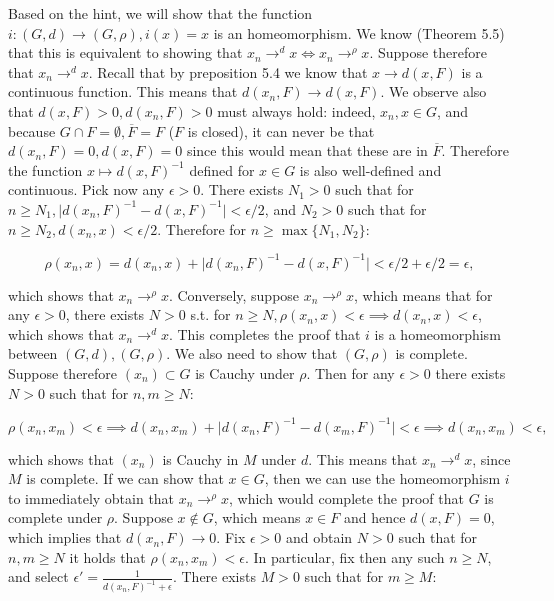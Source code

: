 \begin{solution}
    
    Based on the hint, we will show that the function $i: (G, d) \rightarrow (G, \rho), i(x) = x$ is an homeomorphism.
    We know (Theorem 5.5) that this is equivalent to showing that $x_n \rightarrow^{d} x \iff x_n \rightarrow^{\rho} x$.
    Suppose therefore that $x_n \rightarrow^{d} x$.
    Recall that by preposition 5.4 we know that $x \rightarrow d(x, F)$ is a continuous function.
    This means that $d(x_n, F) \rightarrow d(x, F)$.
    We observe also that $d(x, F) > 0, d(x_n, F) > 0$ must always hold: indeed, $x_n, x \in G$, and because $G \cap F = \emptyset, \overline{F} = F$ ($F$ is closed), it can never be that $d(x_n, F) = 0, d(x, F) = 0$ since this would mean that these are in $\overline{F}$.
    Therefore the function $x \mapsto d(x, F)^{-1}$ defined for $x \in G$ is also well-defined and continuous.
    Pick now any $\epsilon > 0$.
    There exists $N_1 > 0$ such that for $n \geq N_1, \lvert d(x_n, F)^{-1} - d(x, F)^{-1} \rvert < \epsilon/2$, and $N_2 > 0$ such that for $n \geq N_2, d(x_n, x) < \epsilon/2$.
    Therefore for $n \geq \max\{N_1, N_2\}$:

    \[\rho(x_n, x) = d(x_n, x) + \lvert d(x_n, F)^{-1} - d(x, F)^{-1} \rvert < \epsilon/2 + \epsilon/2 = \epsilon,\]

    which shows that $x_n \rightarrow^{\rho} x$.
    Conversely, suppose $x_n \rightarrow^{\rho} x$, which means that for any $\epsilon > 0$, there exists $N > 0$ s.t. for $n \geq N, \rho(x_n, x) < \epsilon \implies d(x_n, x) < \epsilon$, which shows that $x_n \rightarrow^{d} x$.
    This completes the proof that $i$ is a homeomorphism between $(G, d), (G, \rho)$.
    We also need to show that $(G, \rho)$ is complete.
    Suppose therefore $(x_n) \subset G$ is Cauchy under $\rho$.
    Then for any $\epsilon > 0$ there exists $N > 0$ such that for $n, m \geq N$:

    \[\rho(x_n, x_m) < \epsilon \implies d(x_n, x_m) + \lvert d(x_n, F)^{-1} - d(x_m, F)^{-1} \rvert < \epsilon \implies d(x_n, x_m) < \epsilon,\]

    which shows that $(x_n)$ is Cauchy in $M$ under $d$.
    This means that $x_n \rightarrow^{d} x$, since $M$ is complete.
    If we can show that $x \in G$, then we can use the homeomorphism $i$ to immediately obtain that $x_n \rightarrow^{\rho} x$, which would complete the proof that $G$ is complete under $\rho$.
    Suppose $x \notin G$, which means $x \in F$ and hence $d(x, F) = 0$, which implies that $d(x_n, F) \rightarrow 0$.
    Fix $\epsilon > 0$ and obtain $N > 0$ such that for $n, m \geq N$ it holds that $\rho(x_n, x_m) < \epsilon$.
    In particular, fix then any such $n \geq N$, and select $\epsilon' = \frac{1}{d(x_n, F)^{-1} + \epsilon}$.
    There exists $M > 0$ such that for $m \geq M$:
    

\end{solution}
